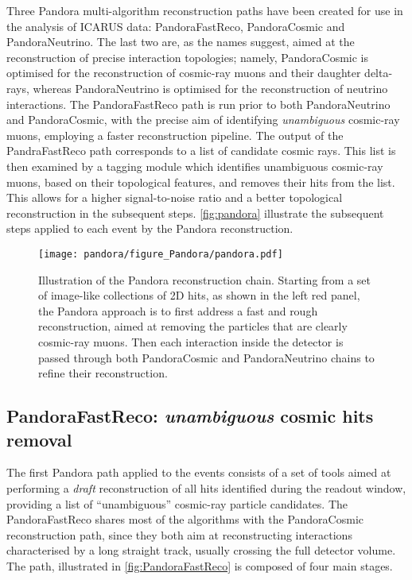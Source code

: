 Three Pandora multi-algorithm reconstruction paths have been created for use in the analysis of ICARUS data: PandoraFastReco, PandoraCosmic and PandoraNeutrino. The last two are, as the names suggest, aimed at the reconstruction of precise interaction topologies; namely,  PandoraCosmic is optimised for the reconstruction of cosmic-ray muons and their daughter delta-rays, whereas PandoraNeutrino is optimised for the reconstruction of neutrino interactions. The PandoraFastReco path is run prior to both PandoraNeutrino and PandoraCosmic, with the precise aim of identifying \emph{unambiguous} cosmic-ray muons, employing a faster reconstruction pipeline. The output of the PandraFastReco path corresponds to a list of candidate cosmic rays. This list is then examined by a tagging module which identifies unambiguous cosmic-ray muons, based on their topological features, and removes their hits from the list. This allows for a higher signal-to-noise ratio and a better topological reconstruction in the subsequent steps. \autoref{fig:pandora} illustrate the subsequent steps applied to each event by the Pandora reconstruction. 

\begin{figure}
    \centering
    \texttt{[image: pandora/figure\_Pandora/pandora.pdf]}
    \caption[Overview of the Pandora reconstruction chain]{Illustration of the Pandora reconstruction chain. Starting from a set of image-like collections of 2D hits, as shown in the left red panel, the Pandora approach is to first address a fast and rough reconstruction, aimed at removing the particles that are clearly cosmic-ray muons. Then each interaction inside the detector is passed through both PandoraCosmic and PandoraNeutrino chains to refine their reconstruction. }
    \label{fig:pandora}
\end{figure}

\subsection{PandoraFastReco: \emph{unambiguous} cosmic hits removal} \label{sec:fast_reco}

The first Pandora path applied to the events consists of a set of tools aimed at performing a \emph{draft} reconstruction of all hits identified during the readout window, providing a list of ``unambiguous'' cosmic-ray particle candidates. The PandoraFastReco shares most of the algorithms with the PandoraCosmic reconstruction path, since they both aim at reconstructing interactions characterised by a long straight track, usually crossing the full detector volume. The path, illustrated in \autoref{fig:PandoraFastReco} is composed of four main stages. 


